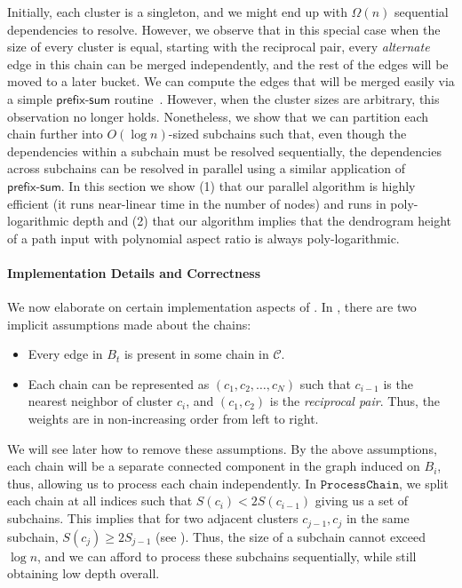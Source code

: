 \documentclass[11pt]{article}
\begin{document}
Initially, each cluster is a singleton, and we might end up with $\Omega(n)$ sequential dependencies to resolve. 
However, we observe that in this special case when the size of every cluster is equal, starting with the reciprocal pair, every {\em alternate} edge in this chain can be merged independently, and the rest of the edges will be moved to a later bucket. 
We can compute the edges that will be merged easily via a simple $\mathsf{prefix\text{-}sum}$ routine~\cite{blellochscan}. 
However, when the cluster sizes are arbitrary, this observation no longer holds.
Nonetheless, we show that we can partition each chain further into $O(\log n)$-sized subchains such that, even though the dependencies within a subchain must be resolved sequentially, the dependencies across subchains can be resolved in parallel using a similar application of $\mathsf{prefix\text{-}sum}$. 
In this section we show (1) that our parallel algorithm is highly efficient (it runs near-linear time in the number of nodes) and runs in poly-logarithmic depth and (2) that our algorithm implies that the dendrogram height of a path input with polynomial aspect ratio is always poly-logarithmic.



\paragraph{Implementation Details and Correctness}
We now elaborate on certain implementation aspects of . In , there are two implicit assumptions made about the chains:
\begin{itemize}
    \item Every edge in $B_t$ is present in some chain in $\mathcal{C}$.
    \item Each chain can be represented as $(c_1,c_2,\ldots, c_N)$ such that $c_{i-1}$ is the nearest neighbor of cluster $c_i$, and $(c_1,c_2)$ is the \emph{reciprocal pair}. 
    Thus, the weights are in non-increasing order from left to right.
\end{itemize}
We will see later how to remove these assumptions. By the above assumptions, each chain will be a separate connected component in the graph induced on $B_i$, thus, allowing us to process each chain independently. In $\mathtt{ProcessChain}$, we split each chain at all indices such that $S(c_i) < 2 S(c_{i-1})$ giving us a set of subchains. This implies that for two adjacent clusters $c_{j-1},c_{j}$ in the same subchain, $S(c_j) \ge 2S_{j-1}$ (see ). Thus, the size of a subchain cannot exceed $\log n$, and we can afford to process these subchains sequentially, while still obtaining low depth overall. 
\end{document}
